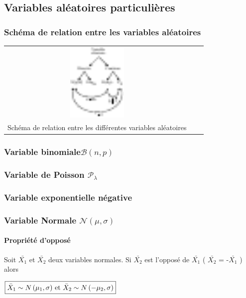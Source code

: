 \newpage
\subsection{Variables aléatoires particulières}

\subsubsection{Schéma de relation entre les variables aléatoires}
\begin{center}
	\begin{tabular}{ccc}
		\includegraphics[width=0.3\textwidth]{images/schema_relation_va.pdf}\\
		Schéma de relation entre les différentes variables aléatoires
	\end{tabular}
\end{center}



\subsubsection{Variable binomiale$\mathcal{B}(n,p)$}
\subsubsection{Variable de Poisson $\mathcal{P}_\lambda$}
\subsubsection{Variable exponentielle négative}
\subsubsection{Variable Normale $\mathcal{N}(\mu,\sigma)$}




\paragraph{Propriété d'opposé}\label{propriete-normale-oppose}
Soit $\bar{X_1}$ et $\bar{X_2}$ deux variables normales. Si $\bar{X_2}$ est l'opposé de $\bar{X_1}$ ( $\bar{X_2}$ = -$\bar{X_1}$ ) alors
\begin{center}
$\boxed{\bar{X}_1 \sim N \left( \mu_1, \sigma \right)$ et $\bar{X}_2 \sim N \left( -\mu_2, \sigma \right)}$
\end{center}




